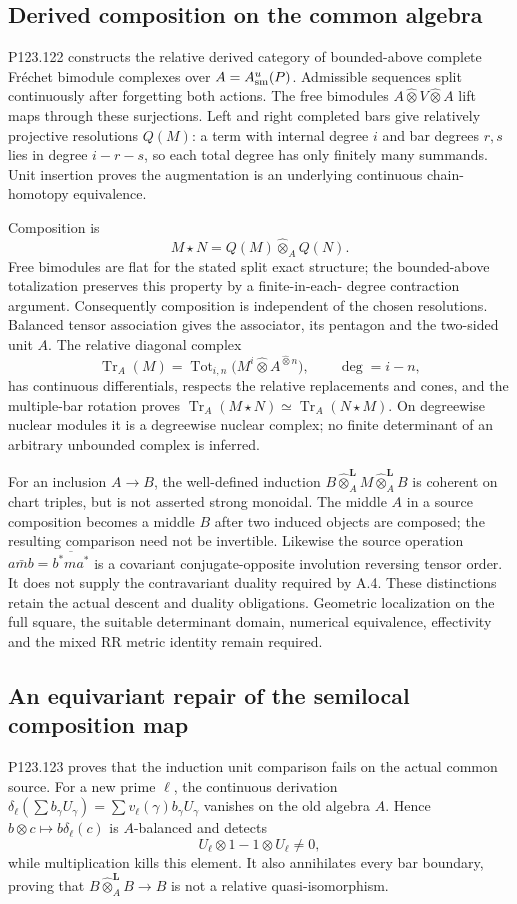 \subsection{Derived composition on the common algebra}
P123.122 constructs the relative derived category of bounded-above
complete Fr\'echet bimodule complexes over $A=A_{\rm sm}^u(P)$.
Admissible sequences split continuously after forgetting both actions.
The free bimodules $A\widehat\otimes V\widehat\otimes A$ lift maps
through these surjections. Left and right completed bars give relatively
projective resolutions $Q(M)$: a term with internal degree $i$ and bar
degrees $r,s$ lies in degree $i-r-s$, so each total degree has only
finitely many summands. Unit insertion proves the augmentation is an
underlying continuous chain-homotopy equivalence.

Composition is
\[
 M\star N=Q(M)\widehat\otimes_A Q(N).
\]
Free bimodules are flat for the stated split exact structure; the
bounded-above totalization preserves this property by a finite-in-each-
degree contraction argument. Consequently composition is independent
of the chosen resolutions. Balanced tensor association gives the
associator, its pentagon and the two-sided unit $A$. The relative
diagonal complex
\[
 \operatorname{Tr}_A(M)
    =\operatorname{Tot}_{i,n}\bigl(M^i\widehat\otimes A^{\widehat\otimes n}\bigr),
 \qquad \deg=i-n,
\]
has continuous differentials, respects the relative replacements and
cones, and the multiple-bar rotation proves
$\operatorname{Tr}_A(M\star N)\simeq\operatorname{Tr}_A(N\star M)$.
On degreewise nuclear modules it is a degreewise nuclear complex;
no finite determinant of an arbitrary unbounded complex is inferred.

For an inclusion $A\to B$, the well-defined induction
$B\widehat\otimes_A^{\mathbf L}M\widehat\otimes_A^{\mathbf L}B$
is coherent on chart triples, but is not asserted strong monoidal.
The middle $A$ in a source composition becomes a middle $B$ after
two induced objects are composed; the resulting comparison need not
be invertible. Likewise the source operation
$a\bar m b=\overline{b^*ma^*}$ is a covariant conjugate-opposite
involution reversing tensor order. It does not supply the contravariant
duality required by A.4. These distinctions retain the actual descent
and duality obligations. Geometric localization on the full square,
the suitable determinant domain, numerical equivalence, effectivity
and the mixed RR metric identity remain required.

\subsection{An equivariant repair of the semilocal composition map}
P123.123 proves that the induction unit comparison fails on the actual
common source. For a new prime $\ell$, the continuous derivation
$\delta_\ell(\sum b_\gamma U_\gamma)=\sum v_\ell(\gamma)b_\gamma U_\gamma$
vanishes on the old algebra $A$. Hence
$b\otimes c\mapsto b\delta_\ell(c)$ is $A$-balanced and detects
\[
 U_\ell\otimes1-1\otimes U_\ell\ne0,
\]
while multiplication kills this element. It also annihilates every
bar boundary, proving that $B\widehat\otimes_A^{\mathbf L}B\to B$
is not a relative quasi-isomorphism.

